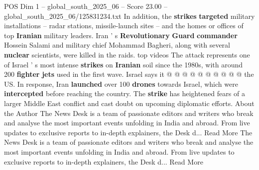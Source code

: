 \begin{textsample}{POS Dim 1 – global\_south\_2025\_06 – Score 23.00 – global\_south\_2025\_06/125831234.txt}
In addition, the \textbf{strikes} \textbf{targeted} military installations -- radar stations, missile-launch sites -- and the homes or offices of top \textbf{Iranian} military leaders.
Iran ' s \textbf{Revolutionary} \textbf{Guard} \textbf{commander} Hossein Salami and military chief Mohammad Bagheri, along with several \textbf{nuclear} scientists, were killed in the raids. top videos The attack represents one of Israel ' s most intense \textbf{strikes} on \textbf{Iranian} soil since the 1980s, with around 200 \textbf{fighter} \textbf{jets} used in the first wave.
Israel says it @ @ @ @ @ @ @ @ @ @ the US.
In response, Iran \textbf{launched} over 100 \textbf{drones} towards Israel, which were \textbf{intercepted} before reaching the country.
The \textbf{strike} has heightened fears of a larger Middle East conflict and cast doubt on upcoming diplomatic efforts.
About the Author The News Desk is a team of passionate editors and writers who break and analyse the most important events unfolding in India and abroad.
From live updates to exclusive reports to in-depth explainers, the Desk d...
Read More The News Desk is a team of passionate editors and writers who break and analyse the most important events unfolding in India and abroad.
From live updates to exclusive reports to in-depth explainers, the Desk d...
Read More

\end{textsample}
